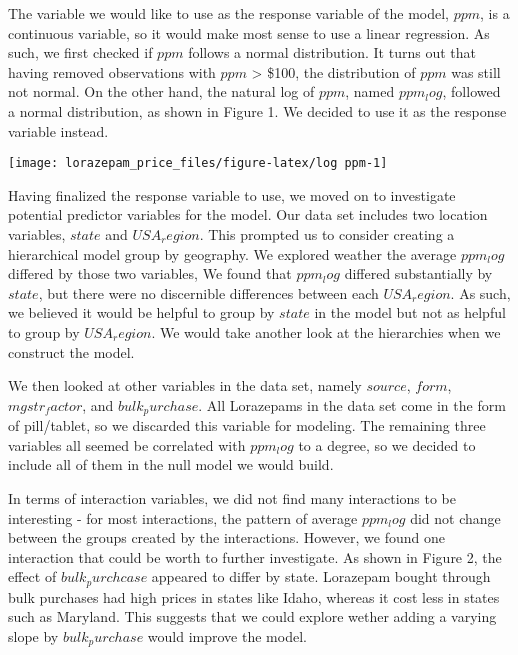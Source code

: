 \documentclass[
]{article}
\begin{document}
The variable we would like to use as the response variable of the model,
\(ppm\), is a continuous variable, so it would make most sense to use a
linear regression. As such, we first checked if \(ppm\) follows a normal
distribution. It turns out that having removed observations with \(ppm\)
\textgreater{} \$100, the distribution of \(ppm\) was still not normal.
On the other hand, the natural log of \(ppm\), named \(ppm_log\),
followed a normal distribution, as shown in Figure 1. We decided to use
it as the response variable instead.

\begin{center}\texttt{[image: lorazepam\_price\_files/figure-latex/log ppm-1]} \end{center}

Having finalized the response variable to use, we moved on to
investigate potential predictor variables for the model. Our data set
includes two location variables, \(state\) and \(USA_region\). This
prompted us to consider creating a hierarchical model group by
geography. We explored weather the average \(ppm_log\) differed by those
two variables, We found that \(ppm_log\) differed substantially by
\(state\), but there were no discernible differences between each
\(USA_region\). As such, we believed it would be helpful to group by
\(state\) in the model but not as helpful to group by \(USA_region\). We
would take another look at the hierarchies when we construct the model.

We then looked at other variables in the data set, namely \(source\),
\(form\), \(mgstr_factor\), and \(bulk_purchase\). All Lorazepams in the
data set come in the form of pill/tablet, so we discarded this variable
for modeling. The remaining three variables all seemed be correlated
with \(ppm_log\) to a degree, so we decided to include all of them in
the null model we would build.

In terms of interaction variables, we did not find many interactions to
be interesting - for most interactions, the pattern of average
\(ppm_log\) did not change between the groups created by the
interactions. However, we found one interaction that could be worth to
further investigate. As shown in Figure 2, the effect of
\(bulk_purchcase\) appeared to differ by state. Lorazepam bought through
bulk purchases had high prices in states like Idaho, whereas it cost
less in states such as Maryland. This suggests that we could explore
wether adding a varying slope by \(bulk_purchase\) would improve the
model.
\end{document}
